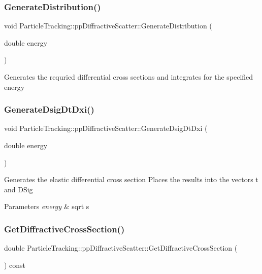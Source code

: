 \subsubsection{\texorpdfstring{Generate\+Distribution()}{GenerateDistribution()}}
{\footnotesize\ttfamily void Particle\+Tracking\+::pp\+Diffractive\+Scatter\+::\+Generate\+Distribution (\begin{DoxyParamCaption}\item[{double}]{energy }\end{DoxyParamCaption})}

Generates the requried differential cross sections and integrates for the specified energy \mbox{\label{classParticleTracking_1_1ppDiffractiveScatter_aea40467446793fb960701530018efdc5}} 
\subsubsection{\texorpdfstring{Generate\+Dsig\+Dt\+Dxi()}{GenerateDsigDtDxi()}}
{\footnotesize\ttfamily void Particle\+Tracking\+::pp\+Diffractive\+Scatter\+::\+Generate\+Dsig\+Dt\+Dxi (\begin{DoxyParamCaption}\item[{double}]{energy }\end{DoxyParamCaption})}

Generates the elastic differential cross section Places the results into the vectors t and D\+Sig 
\begin{DoxyParams}{Parameters}
{\em energy} & sqrt s \\
\hline
\end{DoxyParams}
\mbox{\label{classParticleTracking_1_1ppDiffractiveScatter_a89425dbbdcf14f06ffe2bf50cfde7072}} 
\subsubsection{\texorpdfstring{Get\+Diffractive\+Cross\+Section()}{GetDiffractiveCrossSection()}}
{\footnotesize\ttfamily double Particle\+Tracking\+::pp\+Diffractive\+Scatter\+::\+Get\+Diffractive\+Cross\+Section (\begin{DoxyParamCaption}{ }\end{DoxyParamCaption}) const}

